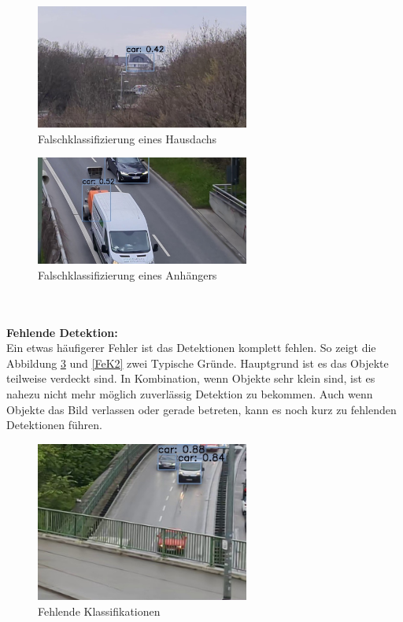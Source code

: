 \documentclass[conference]{IEEEtran}
\begin{document}
	\begin{figure}[!h]
		\begin{center}
			\includegraphics[width=7cm]{Media/Output_108 - Kopie (2).jpg}
			\caption{Falschklassifizierung eines Hausdachs}
			\label{FaK3}
		\end{center}
	\end{figure}
	\begin{figure}[!h]
		\begin{center}
			\includegraphics[width=7cm]{Media/Output_829 - Kopie.jpg}
			\caption{Falschklassifizierung eines Anhängers}
			\label{FaK4}
		\end{center}
	\end{figure}\\
	\\
	\textbf{Fehlende Detektion:}\\
	Ein etwas häufigerer Fehler ist das Detektionen komplett fehlen. So zeigt die Abbildung \ref{FeK} und \ref{FeK2} zwei Typische Gründe. Hauptgrund ist es das Objekte teilweise verdeckt sind. In Kombination, wenn Objekte sehr klein sind, ist es nahezu nicht mehr möglich zuverlässig Detektion zu bekommen. Auch wenn Objekte das Bild verlassen oder gerade betreten, kann es noch kurz zu fehlenden Detektionen führen.\\
	\begin{figure}[!h]
		\begin{center}
			\includegraphics[width=7cm]{Media/Output_680 - Kopie.jpg}
			\caption{Fehlende Klassifikationen}
			\label{FeK}
		\end{center}
	\end{figure}
\end{document}
